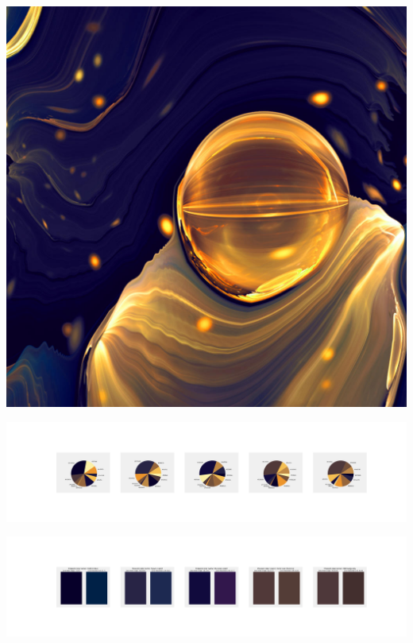 \documentclass[11pt]{article}
\begin{document}
\begin{landscape}
    \begin{center}
    \includegraphics[width=\textwidth]{./nbimg/file (310).jpg}
    \end{center}

    \begin{center}
    \includegraphics[width=250mm]{./nbimg/pie-235.jpg}
    \end{center}

    \begin{center}
    \includegraphics[width=250mm]{./nbimg/peak-235.jpg}
    \end{center}
    


\end{landscape}
\end{document}
